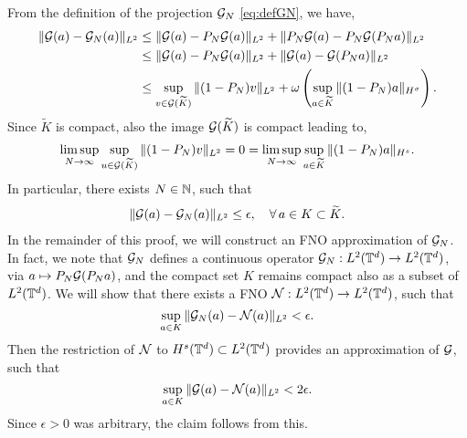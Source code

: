 \documentclass[reqno,a4paper]{amsart}
\begin{document}
From the definition of the projection $\mathcal{G}_N$ \eqref{eq:defGN}, we have,
\begin{align}
\Vert \mathcal{G}(a) - \mathcal{G}_N(a) \Vert_{L^2}
&\le 
\Vert \mathcal{G}(a) - P_N\mathcal{G}(a) \Vert_{L^2}
+
\Vert P_N \mathcal{G}(a) - P_N\mathcal{G}(P_Na) \Vert_{L^2}
\notag\\
&\le 
\Vert \mathcal{G}(a) - P_N\mathcal{G}(a) \Vert_{L^2}
+
\Vert \mathcal{G}(a) - \mathcal{G}(P_Na) \Vert_{L^2}
\notag\\
&\le 
\sup_{v\in \mathcal{G}(\widetilde{K})} \Vert (1-P_N) v \Vert_{L^2}
+
\omega\left(
\sup_{a\in \widetilde{K}}
\Vert (1-P_N)a \Vert_{H^{\sigma}}
\right).
\label{eq:Gw}
\end{align}
Since $\tilde{K}$ is compact, also the image $\mathcal{G}(\widetilde{K})$ is compact leading to,
\begin{align*}
\limsup_{N\to \infty} 
\sup_{u\in \mathcal{G}(\widetilde{K})} \Vert (1-P_N) v \Vert_{L^2}
= 0 =
\limsup_{N\to \infty} 
\sup_{a\in \widetilde{K}}
\Vert (1-P_N)a \Vert_{H^{s}}.
\end{align*}
In particular, there exists $N\in \mathbb{N}$, such that 
\begin{align} \label{eq:aGN}
\Vert \mathcal{G}(a) - \mathcal{G}_N(a) \Vert_{L^2} \le \epsilon, \quad
\forall \, a \in K \subset \widetilde{K}.
\end{align}
In the remainder of this proof, we will construct an FNO approximation of $\mathcal{G}_N$. In fact, we note that $\mathcal{G}_N$ defines a continuous operator $\mathcal{G}_N:L^2(\mathbb{T}^d) \to L^2(\mathbb{T}^d)$, via $a \mapsto P_N\mathcal{G}(P_N a)$, and the compact set $K$ remains compact also as a subset of $L^2(\mathbb{T}^d)$. We will show that there exists a FNO $\mathcal{N}: L^2(\mathbb{T}^d) \to L^2(\mathbb{T}^d)$, such that 
\[
\sup_{a\in K} \Vert \mathcal{G}_N(a) - \mathcal{N}(a) \Vert_{L^2} < \epsilon.
\]
Then the restriction of $\mathcal{N}$ to $H^s(\mathbb{T}^d) \subset L^2(\mathbb{T}^d)$ provides an approximation of $\mathcal{G}$, such that 
\[
\sup_{a\in K} \Vert \mathcal{G}(a) - \mathcal{N}(a) \Vert_{L^2} < 2\epsilon.
\]
Since $\epsilon > 0$ was arbitrary, the claim follows from this.
\end{document}
